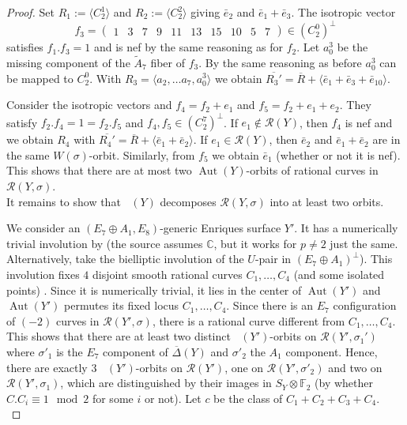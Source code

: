 \documentclass[a4paper]{amsart}
\theoremstyle{definition}
\theoremstyle{plain}
\DeclareMathOperator{\Aut}{Aut}
\DeclareMathOperator{\aut}{Aut^*}
\newcommand{\FF}{\mathbb{F}}
\newcommand{\R}{\mathcal{R}}
\newcommand{\DeltabarY}{\overline{\Delta}(Y)}
\begin{document}
\begin{proof}
Set $R_1:=\langle C_2^1\rangle $ and $R_2:=\langle C_2^2\rangle$ giving $\bar e_2$ and $\bar e_1+\bar e_3$. 
The isotropic vector 
\[f_3 = \begin{pmatrix} 1&  3&  7&  9&  11&  13&  15&  10&  5&  7\end{pmatrix} \in (C_2^0)^\perp\]
satisfies $f_1.f_3=1$ and is nef by the same reasoning as for $f_2$.
Let $a_0^3$ be the missing component of the $\widetilde{A}_7$ fiber of $f_3$. 
By the same reasoning as before $a_0^3$ can be mapped to $C^0_2$.
With $R_3=\langle a_2,\dots a_7, a_0^3\rangle$ we obtain $\overline{R_3'}=\overline{R}+\langle \bar e_1+\bar e_3+ \bar e_{10}\rangle$.

Consider the isotropic vectors and $f_4=f_2+e_1$ and $f_5=f_2+e_1+e_2$.
They satisfy $f_2.f_4=1=f_2.f_5$ and $f_4,f_5 \in (C_2^7)^\perp$. 
If $e_1\notin \R(Y)$, then $f_4$ is nef
and we obtain $R_4$ with $\overline{R_4'}=\overline{R}+\langle \bar e_1 +\bar e_2\rangle$.
If $e_1\in \R(Y)$, then $\bar e_2$ and $\bar e_1+\bar e_2$ are in the same $W(\sigma)$-orbit.
Similarly, from $f_5$ we obtain $\bar e_1$ (whether or not it is nef).
This shows that there are at most two $\Aut(Y)$-orbits of rational curves in $\R(Y,\sigma)$.\\

It remains to show that $\aut(Y)$ decomposes $\R(Y,\sigma)$ into at least two orbits.

We consider an $(E_7\oplus A_1,E_8)$-generic Enriques surface $Y'$. It has a numerically trivial involution by \cite[Theorem 1.18]{brandhorst_shimada:tautaubar} (the source assumes $\mathbb{C}$, but it works for $p\neq 2$ just the same. Alternatively, take the bielliptic involution of the $U$-pair in $(E_7\oplus A_1)^\perp$). This involution fixes $4$ disjoint smooth rational curves $C_1,\dots, C_4$ (and some isolated points) \cite[Table 8.8,Theorem 8.2.21, Remark 8.2.22]{enriquesII}. 
Since it is numerically trivial, it lies in the center of $\Aut(Y')$ and $\Aut(Y')$ permutes its fixed locus $C_1,\dots, C_4$. Since there is an $E_7$ configuration of $(-2)$ curves in $\R(Y',\sigma)$, there is a rational curve different from $C_1,\dots, C_4$. This shows that there are at least two distinct $\aut(Y')$-orbits on $\R(Y',\sigma_1')$ where $\sigma'_1$ is the $E_7$ component of $\DeltabarY$ and $\sigma'_2$ the $A_1$ component. 
Hence, there are exactly $3$ $\aut(Y')$-orbits on $\R(Y')$, one on $\R(Y',\sigma'_2)$ and two on $\R(Y',\sigma_1)$, which are distinguished by their images in $S_Y\otimes \FF_2$ (by whether $C.C_i \equiv 1 \mod 2$ for some $i$ or not). Let $c$ be the class of $C_1+C_2+C_3+C_4$. \\


\end{proof}
\end{document}
